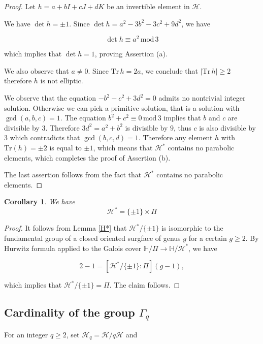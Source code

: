 \documentclass[10pt,a4paper]{amsart}
\newcommand{\HP}{\mathbb{H}}
\newcommand{\Tr}{{\mathrm {Tr}}}
\renewcommand{\mod}{\,\mathrm{mod}\,}
\newtheorem{cor}[lemma]{Corollary}
\newcommand{\cH}{\mathcal{H}}
\begin{document}
\begin{proof} Let $h=a+bI+cJ+dK$ be an invertible element
in $\cH$. 

We have  $\det h=\pm1$. Since 
$\det h=a^2-3b^2-3c^2+9d^2$, we have

$$\det h\equiv a^2 \mod 3$$

\noindent which implies that $\det h=1$, proving Assertion (a).



We also observe that $a\neq 0$. Since $\Tr\, h=2a$, we
conclude that $\mid\Tr\, h\mid\geq 2$ therefore
$h$ is not elliptic.

We observe that the equation
$-b^2-c^2+3 d^2=0$ admits no nontrivial integer solution.
Otherwise we can pick a primitive solution, that is a solution
with $\gcd(a,b,c)=1$. The equation
$b^2+c^2\equiv 0\mod 3$ implies that $b$ and $c$ are divisible by $3$.
Therefore $3 d^2=a^2+b^2$ is divisible by $9$, thus $c$ is also divisible by
$3$ which contradicts that $\gcd(b,c,d)=1$. Therefore
any element $h$ with $\Tr(h)=\pm 2$ is equal to $\pm1$,
which means that $\cH^*$ contains no parabolic elements,
which completes the proof of Assertion (b).

The last assertion follows from the fact that  $\cH^*$ contains no parabolic elements.
\end{proof}


\begin{cor} \label{Bers}We have
$$\cH^*=\{ \pm1 \}\times \Pi$$
\end{cor}

\begin{proof} 
It follows from Lemma \ref{H*} that $\cH^*/\{\pm1\}$ is isomorphic to
the fundamental group of a closed oriented surgface of genus $g$ for a certain $g\geq 2$.
By Hurwitz formula applied to the Galois cover
$\HP/\Pi\to \HP/\cH^*$, we have

$$2-1 =[\cH^*/\{\pm1\}:\Pi] (g-1),$$

\noindent which implies that $\cH^*/\{\pm1\}=\Pi$. The claim follows.
\end{proof}








\subsection{Cardinality of the  group $\Gamma_q$}

For an integer $q\geq 2$, set
$\cH_q=\cH/q\cH$ and
\end{document}
